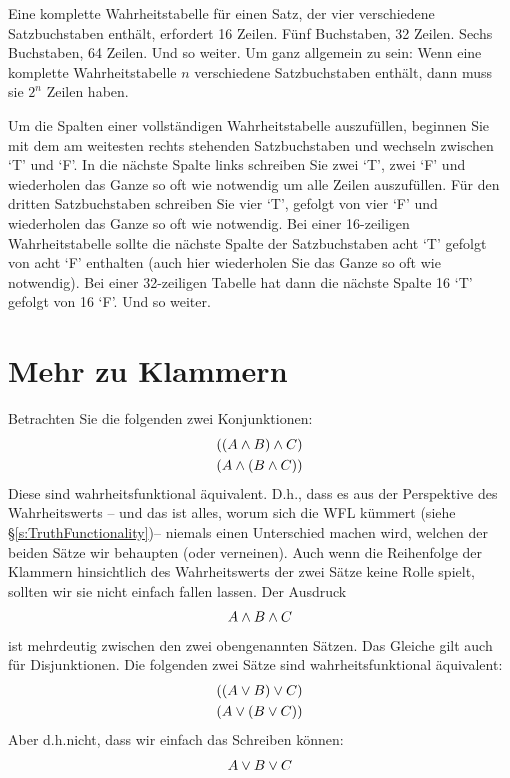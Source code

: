 Eine komplette Wahrheitstabelle für einen Satz, der vier verschiedene Satzbuchstaben enthält, erfordert 16 Zeilen. Fünf Buchstaben, 32 Zeilen. Sechs Buchstaben, 64 Zeilen. Und so weiter. Um ganz allgemein zu sein: Wenn eine komplette Wahrheitstabelle $n$ verschiedene Satzbuchstaben enthält, dann muss sie $2^n$ Zeilen haben.

Um die Spalten einer vollständigen Wahrheitstabelle auszufüllen, beginnen Sie mit dem am weitesten rechts stehenden Satzbuchstaben und wechseln zwischen `T' und `F'. In die nächste Spalte links schreiben Sie zwei `T', zwei `F' und wiederholen das Ganze so oft wie notwendig  um alle Zeilen auszufüllen. Für den dritten Satzbuchstaben schreiben Sie vier `T', gefolgt von vier `F' und wiederholen das Ganze so oft wie notwendig. Bei einer 16-zeiligen Wahrheitstabelle sollte die nächste Spalte der Satzbuchstaben acht `T' gefolgt von acht `F' enthalten (auch hier wiederholen Sie das Ganze so oft wie notwendig). Bei einer 32-zeiligen Tabelle hat dann die nächste Spalte 16 `T' gefolgt von 16 `F'. Und so weiter.

\section{Mehr zu Klammern}\label{s:MoreBracketingConventions}
Betrachten Sie die folgenden zwei Konjunktionen:
	\begin{align*}
		((A \wedge B) \wedge C)\\
		(A \wedge (B \wedge C))
	\end{align*}
Diese sind wahrheitsfunktional äquivalent. D.h.\@, dass es aus der Perspektive des Wahrheitswerts -- und das ist alles, worum sich die WFL kümmert (siehe \S\ref{s:TruthFunctionality})-- niemals einen Unterschied machen wird, welchen der beiden Sätze wir behaupten (oder verneinen). Auch wenn die Reihenfolge der Klammern hinsichtlich des Wahrheitswerts der zwei Sätze keine Rolle spielt, sollten wir sie nicht einfach fallen lassen. Der Ausdruck 
	\begin{align*}
		A \wedge B \wedge C
	\end{align*}
ist mehrdeutig zwischen den zwei obengenannten Sätzen. Das Gleiche gilt auch für Disjunktionen. Die folgenden zwei Sätze sind wahrheitsfunktional äquivalent:
	\begin{align*}
		((A \vee B) \vee C)\\
		(A \vee (B \vee C))
	\end{align*}
Aber d.h.\@ nicht, dass wir einfach das Schreiben können:
	\begin{align*}
		A \vee B \vee C
	\end{align*}

